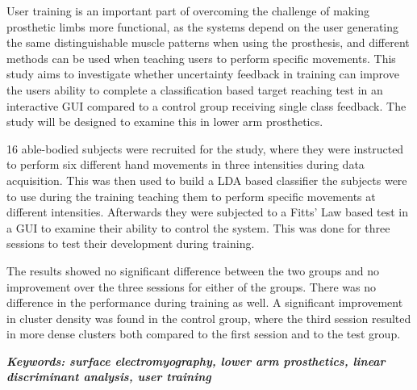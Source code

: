 

User training is an important part of overcoming the challenge of making prosthetic limbs more functional, as the systems depend on the user generating the same distinguishable muscle patterns when using the prosthesis, and different methods can be used when teaching users to perform specific movements. \cite{Powel2014} This study aims to investigate whether uncertainty feedback in training can improve the users ability to complete a classification based target reaching test in an interactive GUI compared to a control group receiving single class feedback. The study will be designed to examine this in lower arm prosthetics.

16 able-bodied subjects were recruited for the study, where they were instructed to perform six different hand movements in three intensities during data acquisition. This was then used to build a LDA based classifier the subjects were to use during the training teaching them to perform specific movements at different intensities. Afterwards they were subjected to a Fitts' Law based test in a GUI to examine their ability to control the system. This was done for three sessions to test their development during training.

The results showed no significant difference between the two groups and no improvement over the three sessions for either of the groups. There was no difference in the performance during training as well. A significant improvement in cluster density was found in the control group, where the third session resulted in more dense clusters both compared to the first session and to the test group.

\textit{\textbf{Keywords: surface electromyography, lower arm prosthetics, linear discriminant analysis, user training}}